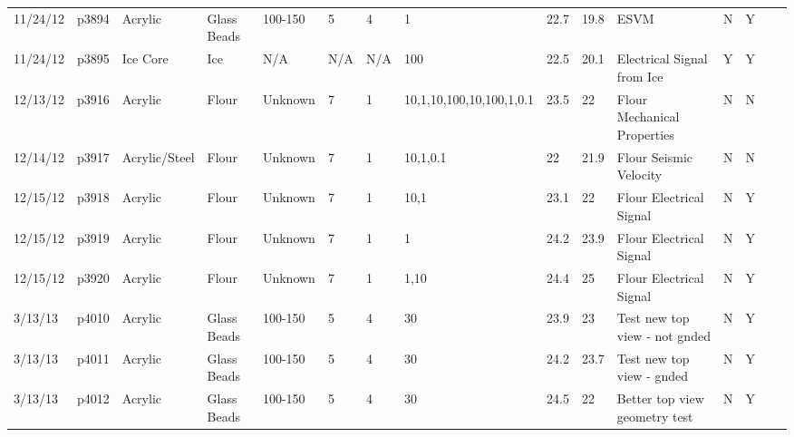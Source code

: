 \begin{landscape}
\begin{longtable}{lllllllllllllll}
11/24/12 & p3894      & Acrylic          & Glass Beads  & 100-150      & 5         & 4             & 1                            & 22.7        & 19.8     & ESVM                                            & N     & Y    &  &  \\
11/24/12 & p3895      & Ice Core         & Ice          & N/A          & N/A       & N/A           & 100                          & 22.5        & 20.1     & Electrical Signal from Ice                      & Y     & Y    &  &  \\
12/13/12 & p3916      & Acrylic          & Flour        & Unknown      & 7         & 1             & 10,1,10,100,10,100,1,0.1     & 23.5        & 22       & Flour Mechanical Properties                     & N     & N    &  &  \\
12/14/12 & p3917      & Acrylic/Steel    & Flour        & Unknown      & 7         & 1             & 10,1,0.1                     & 22          & 21.9     & Flour Seismic Velocity                          & N     & N    &  &  \\
12/15/12 & p3918      & Acrylic          & Flour        & Unknown      & 7         & 1             & 10,1                         & 23.1        & 22       & Flour Electrical Signal                         & N     & Y    &  &  \\
12/15/12 & p3919      & Acrylic          & Flour        & Unknown      & 7         & 1             & 1                            & 24.2        & 23.9     & Flour Electrical Signal                         & N     & Y    &  &  \\
12/15/12 & p3920      & Acrylic          & Flour        & Unknown      & 7         & 1             & 1,10                         & 24.4        & 25       & Flour Electrical Signal                         & N     & Y    &  &  \\
3/13/13  & p4010      & Acrylic          & Glass Beads  & 100-150      & 5         & 4             & 30                           & 23.9        & 23       & Test new top view - not gnded                   & N     & Y    &  &  \\
3/13/13  & p4011      & Acrylic          & Glass Beads  & 100-150      & 5         & 4             & 30                           & 24.2        & 23.7     & Test new top view - gnded                       & N     & Y    &  &  \\
3/13/13  & p4012      & Acrylic          & Glass Beads  & 100-150      & 5         & 4             & 30                           & 24.5        & 22       & Better top view geometry test                   & N     & Y    &  &  \\

\end{longtable}
\end{landscape}
